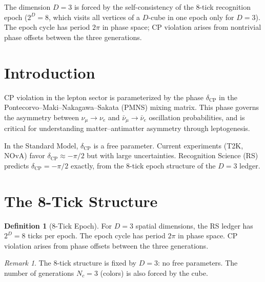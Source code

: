 \documentclass[12pt,a4paper]{article}
\theoremstyle{definition}
\newtheorem{definition}[theorem]{Definition}
\theoremstyle{remark}
\newtheorem{remark}[theorem]{Remark}
\begin{document}
\noindent The dimension $D=3$ is forced by the self-consistency of the
8-tick recognition epoch ($2^D = 8$, which visits all vertices of a
$D$-cube in one epoch only for $D=3$).  The epoch cycle has
period $2\pi$ in phase space; CP violation arises from nontrivial
phase offsets between the three generations.

\section{Introduction}
\label{sec:intro}

CP violation in the lepton sector is parameterized by the phase
$\delta_{\mathrm{CP}}$ in the Pontecorvo--Maki--Nakagawa--Sakata
(PMNS) mixing matrix.  This phase governs the asymmetry between
$\nu_\mu \to \nu_e$ and $\bar{\nu}_\mu \to \bar{\nu}_e$ oscillation
probabilities, and is critical for understanding matter--antimatter
asymmetry through leptogenesis.

In the Standard Model, $\delta_{\mathrm{CP}}$ is a free parameter.
Current experiments (T2K, NOvA) favor $\delta_{\mathrm{CP}} \approx
-\pi/2$ but with large uncertainties.  Recognition Science (RS)~\cite{RS_Axioms} predicts
$\delta_{\mathrm{CP}} = -\pi/2$ exactly, from the 8-tick epoch
structure of the $D = 3$ ledger.

\section{The 8-Tick Structure}
\label{sec:8tick}

\begin{definition}[8-Tick Epoch]
\label{def:8tick}
For $D = 3$ spatial dimensions, the RS ledger has $2^D = 8$ ticks
per epoch.  The epoch cycle has period $2\pi$ in phase space.  CP
violation arises from phase offsets between the three generations.
\end{definition}

\begin{remark}
The 8-tick structure is fixed by $D = 3$: no free parameters.  The
number of generations $N_c = 3$ (colors) is also forced by the cube.
\end{remark}

\end{document}
